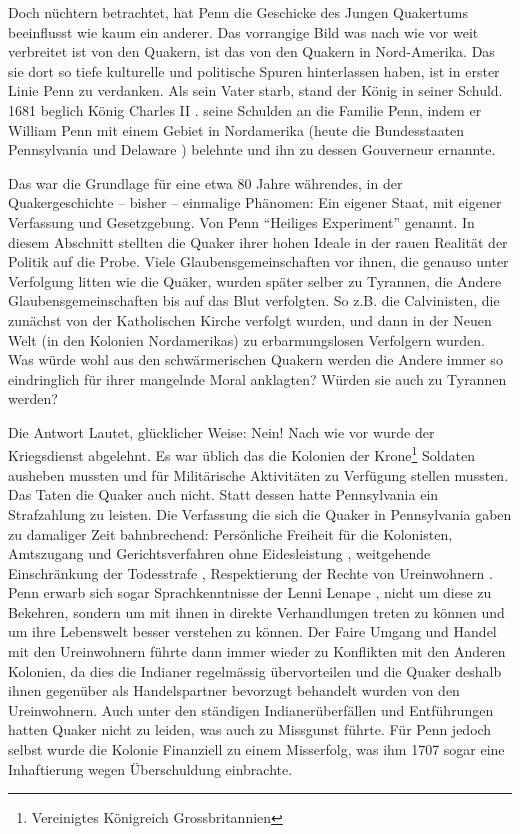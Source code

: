 \medskip

Doch nüchtern betrachtet, hat Penn die Geschicke des Jungen Quakertums
beeinflusst wie kaum  ein anderer. Das vorrangige Bild was nach wie vor weit
verbreitet ist von den Quakern, ist das von den Quakern in Nord-Amerika. Das sie
dort so tiefe kulturelle und politische Spuren hinterlassen haben, ist in erster
Linie Penn zu verdanken. Als sein Vater starb, stand der König in seiner Schuld.
1681 beglich König Charles II . seine
Schulden  an die Familie Penn, indem er William Penn mit einem
Gebiet in Nordamerika (heute die Bundesstaaten Pennsylvania
 und Delaware ) belehnte und ihn
zu dessen Gouverneur ernannte.


Das war die Grundlage für eine etwa 80 Jahre währendes, in der Quakergeschichte
-- bisher -- einmalige Phänomen: Ein eigener Staat, mit eigener Verfassung und
Gesetzgebung. Von Penn "`Heiliges Experiment"' genannt. In diesem Abschnitt
stellten die Quaker ihrer hohen Ideale in der rauen Realität der Politik auf die
Probe. Viele Glaubensgemeinschaften vor ihnen, die genauso unter Verfolgung
litten wie die Quäker, wurden später selber zu Tyrannen, die Andere
Glaubensgemeinschaften bis auf das Blut verfolgten. So z.B. die
Calvinisten, die zunächst von der Katholischen
Kirche verfolgt wurden, und dann in der Neuen Welt (in den Kolonien
Nordamerikas) zu erbarmungslosen Verfolgern wurden. Was würde wohl aus den
schwärmerischen Quakern werden die Andere immer so eindringlich für ihrer
mangelnde Moral anklagten? Würden sie auch zu Tyrannen werden?

\medskip

Die Antwort Lautet, glücklicher Weise: Nein! Nach wie vor wurde der Kriegsdienst
abgelehnt. Es war üblich das die Kolonien der Krone\footnote{Vereinigtes
Königreich Grossbritannien} Soldaten ausheben mussten und für Militärische
Aktivitäten zu Verfügung stellen mussten. Das Taten die Quaker auch nicht. Statt
dessen hatte Pennsylvania ein Strafzahlung zu leisten. Die Verfassung die sich
die Quaker in Pennsylvania gaben zu damaliger Zeit bahnbrechend: Persönliche
Freiheit für die Kolonisten, Amtszugang und Gerichtsverfahren ohne
Eidesleistung , weitgehende Einschränkung der Todesstrafe
, Respektierung der Rechte von Ureinwohnern
. Penn erwarb sich sogar Sprachkenntnisse
 der Lenni Lenape , nicht
um diese zu Bekehren, sondern um mit ihnen in direkte Verhandlungen treten zu
können und um ihre Lebenswelt besser verstehen zu können. Der Faire Umgang und
Handel mit den Ureinwohnern führte dann immer wieder zu Konflikten mit den
Anderen Kolonien, da dies die Indianer regelmässig übervorteilen und die Quaker
deshalb ihnen gegenüber als Handelspartner bevorzugt behandelt wurden von den
Ureinwohnern. Auch unter den ständigen Indianerüberfällen und Entführungen
hatten Quaker nicht zu leiden, was auch zu Missgunst führte. Für Penn jedoch
selbst wurde die Kolonie Finanziell zu einem Misserfolg, was ihm 1707 sogar eine
Inhaftierung
 wegen Überschuldung einbrachte.

